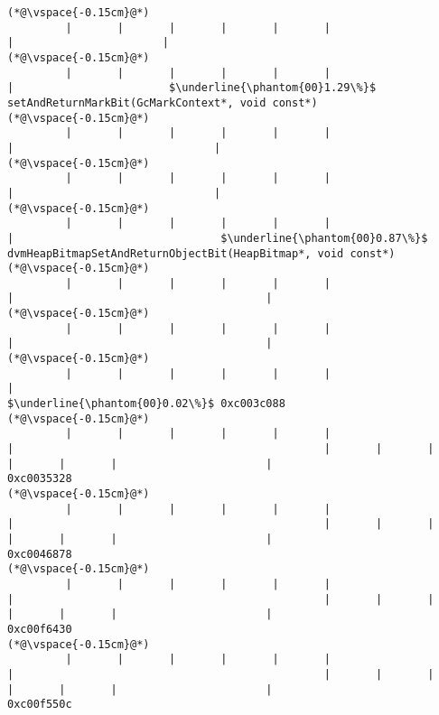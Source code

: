 \begin{lstlisting}[caption=NewDirectByteBuffer, label=profile:C2JNewDirectBuffer-512, numberbychapter=true, frame=lines, float, floatplacement=t]
(*@\vspace{-0.15cm}@*)
         |       |       |       |       |       |                       |                       |
(*@\vspace{-0.15cm}@*)
         |       |       |       |       |       |                       |                        $\underline{\phantom{00}1.29\%}$ setAndReturnMarkBit(GcMarkContext*, void const*)
(*@\vspace{-0.15cm}@*)
         |       |       |       |       |       |                       |                               |
(*@\vspace{-0.15cm}@*)
         |       |       |       |       |       |                       |                               |
(*@\vspace{-0.15cm}@*)
         |       |       |       |       |       |                       |                                $\underline{\phantom{00}0.87\%}$ dvmHeapBitmapSetAndReturnObjectBit(HeapBitmap*, void const*)
(*@\vspace{-0.15cm}@*)
         |       |       |       |       |       |                       |                                       |
(*@\vspace{-0.15cm}@*)
         |       |       |       |       |       |                       |                                       |
(*@\vspace{-0.15cm}@*)
         |       |       |       |       |       |                       |                                        $\underline{\phantom{00}0.02\%}$ 0xc003c088
(*@\vspace{-0.15cm}@*)
         |       |       |       |       |       |                       |                                                |       |       |       |       |       |                       |                                               0xc0035328
(*@\vspace{-0.15cm}@*)
         |       |       |       |       |       |                       |                                                |       |       |       |       |       |                       |                                               0xc0046878
(*@\vspace{-0.15cm}@*)
         |       |       |       |       |       |                       |                                                |       |       |       |       |       |                       |                                               0xc00f6430
(*@\vspace{-0.15cm}@*)
         |       |       |       |       |       |                       |                                                |       |       |       |       |       |                       |                                               0xc00f550c

\end{lstlisting}
